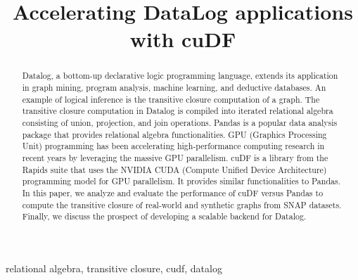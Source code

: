 \documentclass[conference]{IEEEtran}
\begin{document}
\title{Accelerating DataLog applications with cuDF \\
}

\author{
\and
{}
\and
{}
\and
{}
\and
{}
}

\maketitle

\begin{abstract}
Datalog, a bottom-up declarative logic programming language, extends its application in graph mining, program analysis, machine learning, and deductive databases. An example of logical inference is the transitive closure computation of a graph. The transitive closure computation in Datalog is compiled into iterated relational algebra consisting of union, projection, and join operations. Pandas is a popular data analysis package that provides relational algebra functionalities. GPU (Graphics Processing Unit) programming has been accelerating high-performance computing research in recent years by leveraging the massive GPU parallelism. cuDF is a library from the Rapids suite that uses the NVIDIA CUDA (Compute Unified Device Architecture) programming model for GPU parallelism. It provides similar functionalities to Pandas. In this paper, we analyze and evaluate the performance of cuDF versus Pandas to compute the transitive closure of real-world and synthetic graphs from SNAP datasets. Finally, we discuss the prospect of developing a scalable backend for Datalog. 
\end{abstract}

\begin{IEEEkeywords}
relational algebra, transitive closure, cudf, datalog
\end{IEEEkeywords}









\end{document}
